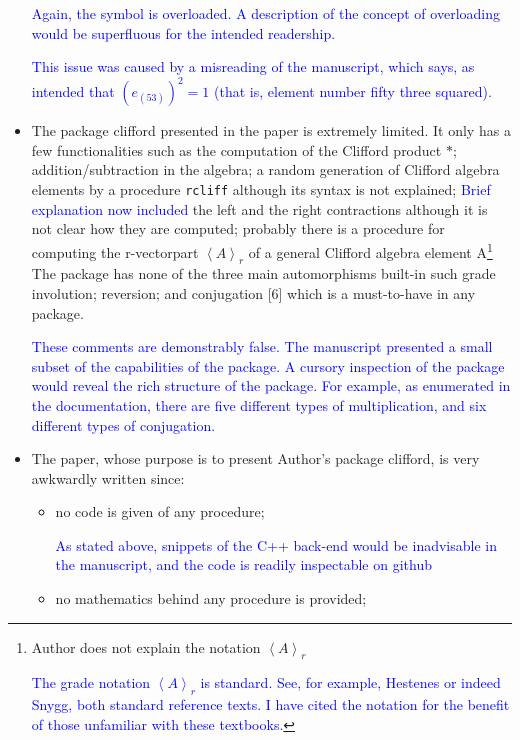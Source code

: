 \documentclass{article}
\begin{document}
\begin{itemize}
{\textcolor{blue}{Again, the {\tt *} symbol is overloaded.  A
  description of the concept of overloading would be superfluous for
  the intended readership.}  }

\textcolor{blue}{This issue was caused by a misreading of the
  manuscript, which says, as intended that $(e_{(53)})^2=1$ (that is,
  element number fifty three squared).}

\item The package clifford presented in the paper is extremely
  limited. It only has a few functionalities such as the computation
  of the Clifford product $*$; addition/subtraction in the algebra; a
  random generation of Clifford algebra elements by a procedure
  \verb+rcliff+ although its syntax is not explained;
  \textcolor{blue}{Brief explanation now included} the left and the
  right contractions although it is not clear how they are computed;
  probably there is a procedure for computing the r-vectorpart
  $\left\langle A\right\rangle_r$ of a general Clifford algebra
  element A\footnote{ Author does not explain the notation
  $\left\langle A\right\rangle_r$

  \textcolor{blue}{The grade notation $\left\langle A\right\rangle_r$
    is standard.  See, for example, Hestenes or indeed Snygg, both
    standard reference texts.  I have cited the notation for the
    benefit of those unfamiliar with these textbooks.}}
  The package
  has none of the three main automorphisms built-in such grade
  involution; reversion; and conjugation [6] which is a must-to-have
  in any package.

\textcolor{blue}{These comments are demonstrably false.  The
  manuscript presented a small subset of the capabilities of the
  package.  A cursory inspection of the package would reveal the rich
  structure of the package.  For example, as enumerated in the
  documentation, there are five different types of multiplication, and
  six different types of conjugation.}

\item The paper, whose purpose is to present Author’s package clifford, is very awkwardly written
since:

\begin{itemize}
\item no code is given of any procedure;

  \textcolor{blue}{As stated above, snippets of the C++ back-end would
    be inadvisable in the manuscript, and the code is readily
    inspectable on github}
\item  no mathematics behind any procedure is provided;


\end{itemize}
\end{itemize}
\end{document}
